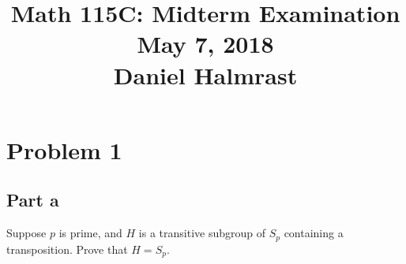 \documentclass[12pt,reqno]{amsart}
\begin{document}
\title[]{Math 115C: Midterm Examination\\May 7, 2018\\Daniel Halmrast}
\maketitle
\large

\section*{Problem 1}
\subsection*{Part a}
Suppose $p$ is prime, and $H$ is a transitive subgroup of $S_p$ containing a
transposition. Prove that $H=S_p$.
\\
\\
\end{document}

